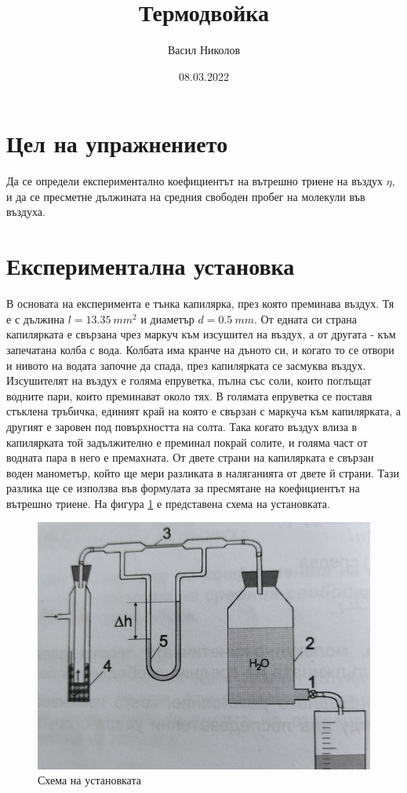 \documentclass[%
 reprint,
 amsmath,amssymb,
 aps,
]{revtex4-2}
\begin{document}
\setlength{\abovedisplayskip}{3pt}
\setlength{\belowdisplayskip}{3pt}    

\title{Термодвойка}
\author{Васил Николов}
\date{08.03.2022}
\maketitle

\section{Цел на упражнението}

Да се определи експериментално коефициентът на вътрешно триене на въздух $\eta$, и да се пресметне дължината на средния свободен пробег на молекули във въздуха. 

\section{Експериментална установка}

В основата на експеримента е тънка капилярка, през която преминава въздух. Тя е с дължина $l=13.35 \ \si{mm^2}$ и диаметър $d = 0.5 \ \si{mm}$. От едната си страна капилярката е свързана чрез маркуч към изсушител на въздух, а от другата - към запечатана колба с вода. Колбата има кранче на дъното си, и когато то се отвори и нивото на водата започне да спада, през капилярката се засмуква въздух. Изсушителят на въздух е голяма епруветка, пълна със соли, които поглъщат водните пари, които преминават около тях. В голямата епруветка се поставя стъклена тръбичка, единият край на която е свързан с маркуча към капилярката, а другият е заровен под повърхността на солта. Така когато въздух влиза в капилярката той задължително е преминал покрай солите, и голяма част от водната пара в него е премахната. От двете страни на капилярката е свързан воден манометър, който ще мери разликата в наляганията от двете й страни. Тази разлика ще се използва във формулата за пресмятане на коефициентът на вътрешно триене. На фигура \ref{fig:1} е представена схема на установката. 

\begin{figure}[H] 
    \centering
    \includegraphics[width=0.9\columnwidth, keepaspectratio=true]{scheme_1.jpg}
    \caption{Схема на установката}\label{fig:1} 
\end{figure}
\end{document}
